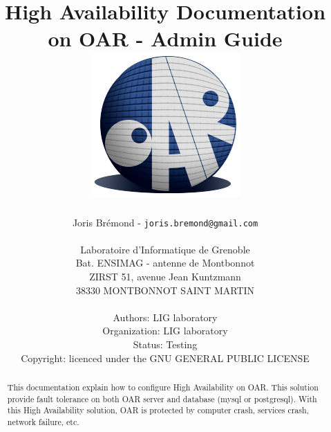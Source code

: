 \documentclass[a4paper,10pt]{report}
\title{High Availability Documentation on OAR - Admin Guide\\
\includegraphics[scale=0.7]{schema/oar_logo_detoure.png}}
\author{Joris Brémond - \texttt{joris.bremond@gmail.com}\\
\\
Laboratoire d'Informatique de Grenoble\\
Bat. ENSIMAG - antenne de Montbonnot\\
ZIRST 51, avenue Jean Kuntzmann\\
38330 MONTBONNOT SAINT MARTIN\\
\\
Authors: LIG laboratory\\
Organization: LIG laboratory\\
Status: Testing\\
Copyright: licenced under the GNU GENERAL PUBLIC LICENSE\\
}
\begin{document}
\maketitle
\tableofcontents

\begin{abstract}
This documentation explain how to configure High Availability on OAR. This solution provide fault tolerance on both OAR server and database (mysql or postgresql).
With this High Availability solution, OAR is protected by computer crash, services crash, network failure, etc.
\end{abstract}












  
\end{document}
